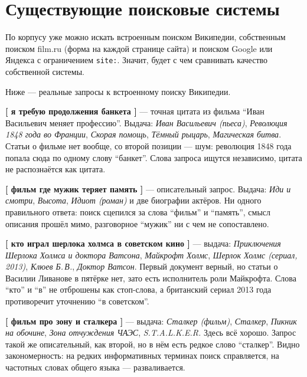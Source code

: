 \section{Существующие поисковые системы}

По корпусу уже можно искать встроенным поиском Википедии, собственным поиском film.ru
(форма на каждой странице сайта) и поиском Google или Яндекса с ограничением
\texttt{site:}. Значит, будет с чем сравнивать качество собственной системы.

Ниже --- реальные запросы к встроенному поиску Википедии.

\textbf{[ я требую продолжения банкета ]} --- точная цитата из фильма \enquote{Иван
Васильевич меняет профессию}. Выдача: \emph{Иван Васильевич (пьеса)}, \emph{Революция
1848 года во Франции}, \emph{Скорая помощь}, \emph{Тёмный рыцарь}, \emph{Магическая
битва}. Статьи о фильме нет вообще, со второй позиции --- шум: революция 1848 года
попала сюда по одному слову \enquote{банкет}. Слова запроса ищутся независимо, цитата
не распознаётся как цитата.

\textbf{[ фильм где мужик теряет память ]} --- описательный запрос. Выдача: \emph{Иди и
смотри}, \emph{Высота}, \emph{Идиот (роман)} и две биографии актёров. Ни одного
правильного ответа: поиск сцепился за слова \enquote{фильм} и \enquote{память}, смысл
описания прошёл мимо, разговорное \enquote{мужик} ни с чем не сопоставлено.

\textbf{[ кто играл шерлока холмса в советском кино ]} --- выдача: \emph{Приключения
Шерлока Холмса и доктора Ватсона}, \emph{Майкрофт Холмс}, \emph{Шерлок Холмс (сериал,
2013)}, \emph{Клюев Б.\,В.}, \emph{Доктор Ватсон}. Первый документ верный, но статьи о
Василии Ливанове в пятёрке нет, зато есть исполнитель роли Майкрофта. Слова \enquote{кто}
и \enquote{в} не отброшены как стоп-слова, а британский сериал 2013 года противоречит
уточнению \enquote{в советском}.

\textbf{[ фильм про зону и сталкера ]} --- выдача: \emph{Сталкер (фильм)},
\emph{Сталкер}, \emph{Пикник на обочине}, \emph{Зона отчуждения ЧАЭС},
\emph{S.T.A.L.K.E.R.} Здесь всё хорошо. Запрос такой же описательный, как второй, но в
нём есть редкое слово \enquote{сталкер}. Видно закономерность: на редких информативных
терминах поиск справляется, на частотных словах общего языка --- разваливается.

\pagebreak
